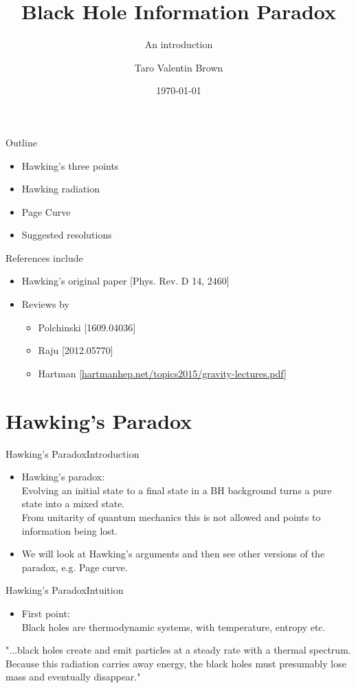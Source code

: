 \documentclass{beamer}[10]
\title{Black Hole Information Paradox}
\subtitle{An introduction}
\author{Taro Valentin Brown}
\institute{Center for Quantum Mathematics and Physics (QMAP), Davis}
\date{\today}
\begin{document}
\frame{\titlepage \vspace{-0.5cm}
}

\begin{frame}{Outline}{}
	\begin{itemize}
		\item Hawking's three points
		\item Hawking radiation
		\item Page Curve
		\item Suggested resolutions
	\end{itemize}
\vspace*{0.5cm}
References include
	\begin{itemize}
	\item Hawking's original paper [Phys. Rev. D 14, 2460]
	\item Reviews by 
	\begin{itemize}
		\item Polchinski [1609.04036]
		\item Raju [2012.05770]
		\item Hartman [\url{hartmanhep.net/topics2015/gravity-lectures.pdf}]
	\end{itemize}
\end{itemize}
\end{frame}
\section{Hawking's Paradox}
\begin{frame}{Hawking's Paradox}{Introduction}
	\begin{itemize}
		\item Hawking's paradox: 
		\\
		Evolving an initial state to a final state in a BH background turns a pure state into a mixed state. 
		\\
		From unitarity of quantum mechanics this is not allowed and points to information being lost. 
		\item We will look at Hawking's arguments and then see other versions of the paradox, e.g. Page curve.
	\end{itemize}
\end{frame}

\begin{frame}{Hawking's Paradox}{Intuition}
	\begin{itemize}
		\item First point:\\
		 Black holes are thermodynamic systems, with temperature, entropy etc. 
	\end{itemize}
"...black holes create and emit particles at a steady rate with a thermal spectrum. Because this radiation carries away energy, the black holes must presumably lose mass and eventually disappear."
\end{frame}
\end{document}
